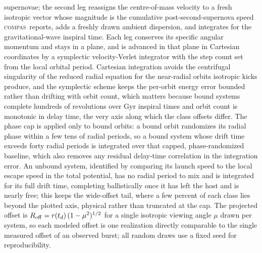 \documentclass[twocolumn,apj]{openjournal}
\newcommand{\compas}{\textsc{compas}}
\begin{document}
supernovae; the second leg reassigns the centre-of-mass velocity to a fresh
isotropic vector whose magnitude is the cumulative post-second-supernova speed
\compas\ reports, adds a freshly drawn ambient dispersion, and integrates for
the gravitational-wave inspiral time. Each leg conserves its specific angular
momentum and stays in a plane, and is advanced in that plane in Cartesian
coordinates by a symplectic velocity-Verlet integrator with the step count set
from the local orbital period. Cartesian integration avoids the centrifugal
singularity of the reduced radial equation for the near-radial orbits isotropic
kicks produce, and the symplectic scheme keeps the per-orbit energy error
bounded rather than drifting with orbit count, which matters because bound
systems complete hundreds of revolutions over Gyr inspiral times and orbit
count is monotonic in delay time, the very axis along which the class offsets
differ. The phase cap is applied only to bound orbits: a bound orbit randomizes
its radial phase within a few tens of radial periods, so a bound system whose
drift time exceeds forty radial periods is integrated over that capped,
phase-randomized baseline, which also removes any residual delay-time
correlation in the integration error. An unbound system, identified by
comparing its launch speed to the local escape speed in the total potential, has
no radial period to mix and is integrated for its full drift time, completing
ballistically once it has left the host and is nearly free; this keeps the
wide-offset tail, where a few percent of each class lies beyond the plotted
axis, physical rather than truncated at the cap. The projected offset is
$R_{\rm off} = r(t_d)\,(1 - \mu^2)^{1/2}$ for a single isotropic viewing angle
$\mu$ drawn per system, so each modeled offset is one realization directly
comparable to the single measured offset of an observed burst; all random draws
use a fixed seed for reproducibility.
\end{document}
